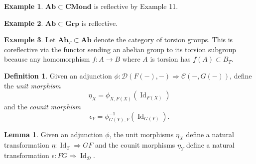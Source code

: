 \documentclass[10pt,letterpaper,cm]{nupset}
\theoremstyle{definition}
\newtheorem*{definition}{Definition}
\newtheorem{exmp}{Example}
\newtheorem{lemma}{Lemma}
\newcommand{\1}{\mathbf{1}}
\renewcommand{\c}{\mathscr{C}}
\renewcommand{\d}{\mathscr{D}}
\newcommand{\0}{\vec 0}
\DeclareMathOperator{\id}{Id}
\begin{document}
\begin{exmp}
$\mathbf{Ab}\subset \mathbf{CMond}$ is reflective by Example 11. 
\end{exmp}

\begin{exmp}
$\mathbf{Ab}\subset \mathbf{Grp}$ is reflective. 
\end{exmp}

\begin{exmp}
Let $\mathbf{Ab}_T\subset \mathbf{Ab}$ denote the category of torsion groups. This is coreflective via the functor sending an abelian group to its torsion subgroup  because any homomorphism $f: A \to B$ where $A$ is torsion has $f(A) \subset B_T$.
\end{exmp}

\begin{definition}
Given an adjunction $\phi: \d(F(-), -) \Rightarrow \c(-, G(-))$, define the \textit{unit morphism} $$\eta_X =\phi_{X, F(X)}(\id_{F(X)})$$ and the \textit{counit morphism} $$\epsilon_Y =\phi_{G(Y), Y}^{-1}(\id_{G(Y)}).$$
\end{definition}

\begin{lemma}
Given an adjunction $\phi$, the unit morphisms $\eta_X$ define a natural transformation $\eta: \id_{\c} \Rightarrow GF$ and the counit morphisms $\eta_Y$ define a natural transformation $\epsilon: FG \Rightarrow \id_{\d}$.
\end{lemma}
\end{document}
